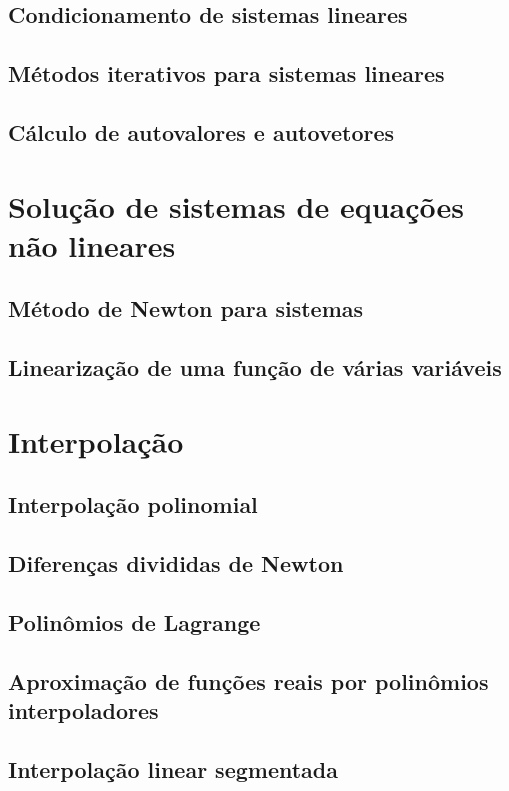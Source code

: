 \documentclass{article}
\theoremstyle{plain}
\theoremstyle{definition}
\theoremstyle{remark}
\begin{document}
\subsection{Condicionamento de sistemas lineares}
\subsection{Métodos iterativos para sistemas lineares}
\subsection{Cálculo de autovalores e autovetores}

\section{Solução de sistemas de equações não lineares}

\subsection{Método de Newton para sistemas}
\subsection{Linearização de uma função de várias variáveis}

\section{Interpolação}

\subsection{Interpolação polinomial}
\subsection{Diferenças divididas de Newton}
\subsection{Polinômios de Lagrange}
\subsection{Aproximação de funções reais por polinômios interpoladores}
\subsection{Interpolação linear segmentada}
\end{document}
